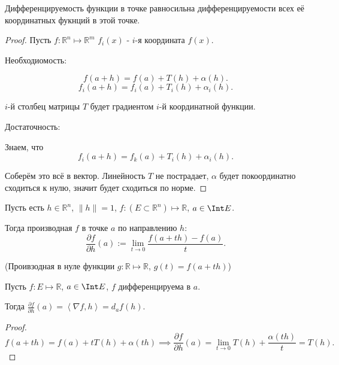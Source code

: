 \begin{theorem} \thmslashn

    Дифференцируемость функции в точке равносильна дифференцируемости всех её координатных фукнций в этой точке.
    \begin{proof} \thmslashn

        Пусть $f : \mathbb{R}^{n} \mapsto \mathbb{R}^{m}$ $f_{i}(x)$ - $i$-я координата $f(x)$.

        Необходиомость:

        \[ f(a+h) = f(a) + T(h) + \alpha(h) .\]
        \[ f_{i}(a+h) = f_{i}(a) + T_{i}(h) + \alpha_{i}(h) .\]

        $i$-й столбец матрицы $T$ будет градиентом $i$-й координатной функции.
        
        Достаточность:

        Знаем, что 
        \[ f_{i}(a+h) = f_{k}(a) + T_{i}(h) + \alpha_{i}(h) .\]

        Соберём это всё в вектор. Линейность $T$ не пострадает, $\alpha$ будет покоординатно сходиться к нулю, значит будет сходиться по норме.
    \end{proof}
\end{theorem}
\begin{definition} \thmslashn 

    Пусть есть $h\in \mathbb{R}^{n}$, $\|h\| = 1$, $f : (E \subset \mathbb{R}^{n}) \mapsto \mathbb{R}$, $a\in \Int E$.

    Тогда производная $f$ в точке $a$ по направлению $h$:
    \[ \frac{\partial f}{\partial h}(a) := \lim\limits_{t \to 0} \frac{f(a+th)-f(a)}{t} .\]

    (Проивзодная в нуле функции $g : \mathbb{R} \mapsto \mathbb{R}$, $g(t) = f(a+th)$)
\end{definition}
\begin{theorem} \thmslashn

    Пусть $f : E \mapsto \mathbb{R}$, $a\in \Int E$, $f$ дифференцируема в $a$.

    Тогда $\frac{\partial f}{\partial h}(a) = \left<\nabla f, h\right> = d_{a}f(h)$.

    \begin{proof} \thmslashn
    
        \[ f(a+th) = f(a) + tT(h) + \alpha(th) \implies \frac{\partial f}{\partial h} (a) = \lim\limits_{t \to 0} T(h) + \frac{\alpha(th)}{t} = T(h) .\] 
    \end{proof}
\end{theorem}
